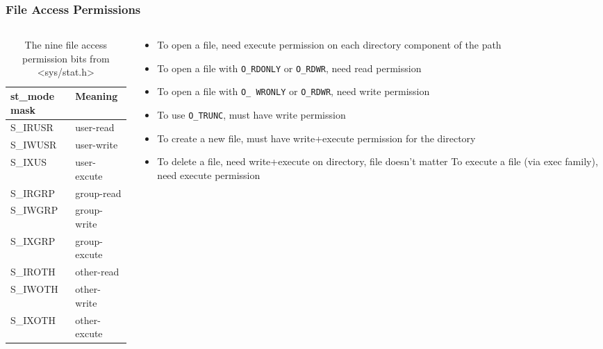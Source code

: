 \documentclass[newPxFont,sthlmFooter,nooffset]{beamer}
\newcommand\Fontvi{\fontsize{10}{11}\selectfont}
\begin{document}
\begin{frame}[t]
  \frametitle{File Access Permissions}
\Fontvi
  \begin{columns}[T]
    \begin{column}{0.4\textwidth}
      \begin{table}[h]\label{fig:4.6}
        \centering
        \begin{tabular}{l | l}
          st\_mode mask & Meaning \\ \hline
          S\_IRUSR & user-read   \\
          S\_IWUSR & user-write  \\
          S\_IXUS  & user-excute \\ \hline
          S\_IRGRP & group-read   \\
          S\_IWGRP & group-write  \\
          S\_IXGRP & group-excute \\ \hline
          S\_IROTH & other-read   \\
          S\_IWOTH & other-write  \\
          S\_IXOTH & other-excute \\
        \end{tabular}
        \caption{The nine file access permission bits from <sys/stat.h>}
        \end{table}
    \end{column}
    \begin{column}{0.6\textwidth}
      \begin{itemize}
      \item To open a file, need execute permission on each directory
        component of the path
      \item To open a file with \texttt{O\_RDONLY} or
        \texttt{O\_RDWR}, need read permission
      \item To open a file with \texttt{O\_ WRONLY} or
        \texttt{O\_RDWR}, need write permission
      \item To use \texttt{O\_TRUNC}, must have write permission
      \item To create a new file, must have write+execute permission
        for the directory
      \item To delete a file, need write+execute on directory, file
        doesn’t matter To execute a file (via exec family), need
        execute permission
      \end{itemize}
    \end{column}
  \end{columns}

\end{frame}
\end{document}
